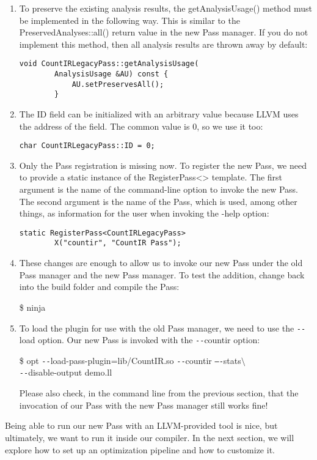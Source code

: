 \begin{enumerate}
	\item To preserve the existing analysis results, the getAnalysisUsage() method must be implemented in the following way. This is similar to the PreservedAnalyses::all() return value in the new Pass manager. If you do not implement this method, then all analysis results are thrown away by default:
	\begin{lstlisting}[caption={}]
		void CountIRLegacyPass::getAnalysisUsage(
		AnalysisUsage &AU) const {
			AU.setPreservesAll();
		}
	\end{lstlisting}
	
	\item The ID field can be initialized with an arbitrary value because LLVM uses the address of the field. The common value is 0, so we use it too:
	\begin{lstlisting}[caption={}]
		char CountIRLegacyPass::ID = 0;
	\end{lstlisting}
	
	\item Only the Pass registration is missing now. To register the new Pass, we need to provide a static instance of the RegisterPass<> template. The first argument is the name of the command-line option to invoke the new Pass. The second argument is the name of the Pass, which is used, among other things, as information for the user when invoking the -help option:
	\begin{lstlisting}[caption={}]
		static RegisterPass<CountIRLegacyPass>
		X("countir", "CountIR Pass");
	\end{lstlisting}
	
	\item These changes are enough to allow us to invoke our new Pass under the old Pass manager and the new Pass manager. To test the addition, change back into the build folder and compile the Pass:
	\begin{tcolorbox}[colback=white,colframe=black]
		\$ ninja
	\end{tcolorbox}
	
	\item To load the plugin for use with the old Pass manager, we need to use the \verb|--|load option. Our new Pass is invoked with the \verb|--|countir option:
	\begin{tcolorbox}[colback=white,colframe=black]
		\$ opt \verb|--|load-pass-plugin=lib/CountIR.so \verb|--|countir \verb|–-|stats$\setminus$ \\
		\hspace*{0.5cm}\verb|--|disable-output demo.ll
	\end{tcolorbox}
	
	\begin{tcolorbox}[colback=blue!5!white,colframe=blue!75!black, title=Tip]
		Please also check, in the command line from the previous section, that the invocation of our Pass with the new Pass manager still works fine!
	\end{tcolorbox}
	
\end{enumerate}

Being able to run our new Pass with an LLVM-provided tool is nice, but ultimately, we want to run it inside our compiler. In the next section, we will explore how to set up an optimization pipeline and how to customize it.\par






